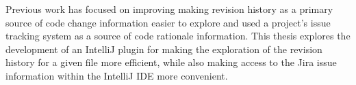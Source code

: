 
Previous work has focused on improving making revision history as a primary source of code change information easier to explore and used a project's issue tracking system as a source of code rationale information. 
This thesis explores the development of an IntelliJ plugin for making the exploration of the revision history for a given file more efficient, while also making access to the Jira issue information within the IntelliJ IDE more convenient.

\endinput

Any text after an \endinput is ignored.
You could put scraps here or things in progress.